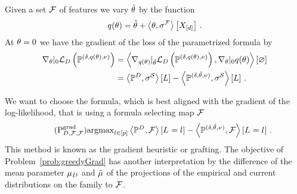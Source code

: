 Given a set $\mathcal{F}$ of features we vary $\tilde{\theta}$ by the function
\begin{align*}
    q(\theta) = \tilde{\theta} + \left\langle \theta,\sigma^{\mathcal{F}}\right\rangle \left[ X_{[d]} \right] \, .
\end{align*}
At $\theta=0$ we have the gradient of the loss of the parametrized formula by
\begin{align*}
    \nabla_{\theta}|_{0}
    \mathcal{L}_{D}\left(\mathbb{P}^{(\delta,q(\theta),\nu)}\right)
    &= \left\langle 
        \nabla_{q(\theta)}|_{\tilde{\theta}}  \mathcal{L}_{D}\left(\mathbb{P}^{(\delta,q(\theta),\nu)}\right),
        \nabla_{\theta}|_{0}  q(\theta)
    \right\rangle \left[ \varnothing \right]  \\
    &= \left\langle \mathbb{P}^{D},\sigma^{\mathcal{S}}\right\rangle \left[ L \right] -   \left\langle \mathbb{P}^{(\delta, \tilde{\theta}, \nu)},\sigma^{\mathcal{S}}\right\rangle \left[ L \right] \, .
\end{align*}


We want to choose the formula, which is best aligned with the gradient of the log-likelihood, that is using a formula selecting map $\mathcal{F}$
\begin{align}
    \label{prob:greedyGrad} \tag{$\mathrm{P}^{\mathrm{grad}}_{\datamap,\formulaset,\fselectionmap}$}
    \argmax_{\selindex\in[\seldim]} \contractionof{\empdistribution,\fselectionmap}{\indexedselvariable}
    - \contractionof{\expdistof{(\naivestat, \naivecanparam, \basemeasure)},\fselectionmap}{\indexedselvariable} \, .
\end{align}
This method is known as the gradient heuristic or grafting.
The objective of Problem~\eqref{prob:greedyGrad} has another interpretation by the difference of the mean parameter $\mu_{D}$ and $\tilde{\mu}$ of the projections of the empirical and current distributions on the family to $\mathcal{F}$. %

